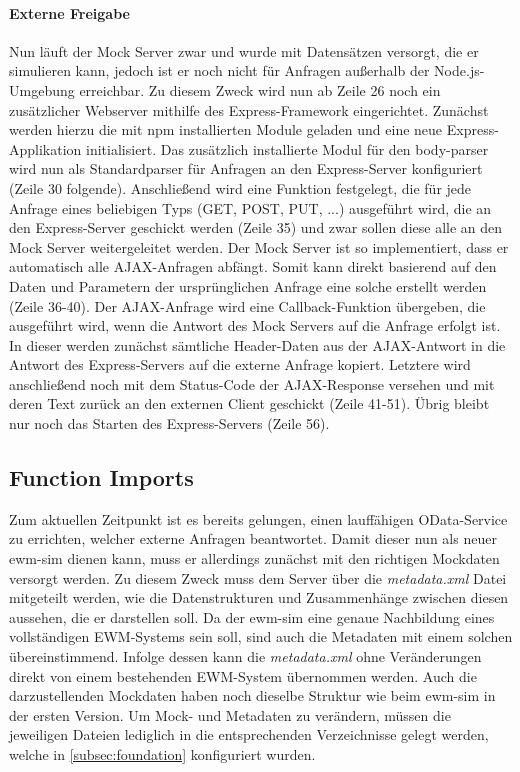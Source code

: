 \paragraph{Externe Freigabe}
Nun läuft der Mock Server zwar und wurde mit Datensätzen versorgt, die er simulieren kann, jedoch ist er noch nicht für Anfragen außerhalb der Node.js-Umgebung erreichbar.
Zu diesem Zweck wird nun ab Zeile 26 noch ein zusätzlicher Webserver mithilfe des Express-Framework eingerichtet.
Zunächst werden hierzu die mit \ac{npm} installierten Module geladen und eine neue Express-Applikation initialisiert.
Das zusätzlich installierte Modul für den body-parser wird nun als Standardparser für Anfragen an den Express-Server konfiguriert (Zeile 30 folgende).
Anschließend wird eine Funktion festgelegt, die für jede Anfrage eines beliebigen Typs (GET, POST, PUT, ...) ausgeführt wird, die an den Express-Server geschickt werden (Zeile 35) und zwar sollen diese alle an den Mock Server weitergeleitet werden.
Der Mock Server ist so implementiert, dass er automatisch alle \ac{AJAX}-Anfragen abfängt.
Somit kann direkt basierend auf den Daten und Parametern der ursprünglichen Anfrage eine solche erstellt werden (Zeile 36-40).
Der \ac{AJAX}-Anfrage wird eine Callback-Funktion übergeben, die ausgeführt wird, wenn die Antwort des Mock Servers auf die Anfrage erfolgt ist.
In dieser werden zunächst sämtliche Header-Daten aus der \ac{AJAX}-Antwort in die Antwort des Express-Servers auf die externe Anfrage kopiert.
Letztere wird anschließend noch mit dem Status-Code der \ac{AJAX}-Response versehen und mit deren Text zurück an den externen Client geschickt (Zeile 41-51).
Übrig bleibt nur noch das Starten des Express-Servers (Zeile 56).


\subsection{Function Imports}
Zum aktuellen Zeitpunkt ist es bereits gelungen, einen lauffähigen \ac{OData}-Service zu errichten, welcher externe Anfragen beantwortet.
Damit dieser nun als neuer \ac{ewm-sim} dienen kann, muss er allerdings zunächst mit den richtigen Mockdaten versorgt werden.
Zu diesem Zweck muss dem Server über die \emph{metadata.xml} Datei mitgeteilt werden, wie die Datenstrukturen und Zusammenhänge zwischen diesen aussehen, die er darstellen soll.
Da der \ac{ewm-sim} eine genaue Nachbildung eines vollständigen \ac{EWM}-Systems sein soll, sind auch die Metadaten mit einem solchen übereinstimmend.
Infolge dessen kann die \emph{metadata.xml} ohne Veränderungen direkt von einem bestehenden \ac{EWM}-System übernommen werden.
Auch die darzustellenden Mockdaten haben noch dieselbe Struktur wie beim \ac{ewm-sim} in der ersten Version.
Um Mock- und Metadaten zu verändern, müssen die jeweiligen Dateien lediglich in die entsprechenden Verzeichnisse gelegt werden, welche in \autoref{subsec:foundation} konfiguriert wurden.

